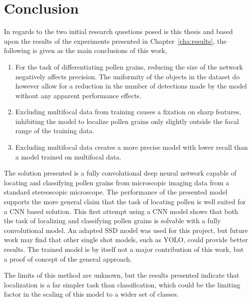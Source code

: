 \chapter{Conclusion}\label{cha:conclusion}


In regards to the two initial research questions posed is this thesis and based upon the results of the experiments presented in Chapter~\ref{cha:results}, the following is given as the main conclusions of this work,

\begin{enumerate}
    \item For the task of differentiating pollen grains, reducing the size of the network negatively affects precision. The uniformity of the objects in the dataset do however allow for a reduction in the number of detections made by the model without any apparent performance effects.
    \item Excluding multifocal data from training causes a fixation on sharp features, inhibiting the model to localize pollen grains only slightly outside the focal range of the training data.
    \item Excluding multifocal data creates a more precise model with lower recall than a model trained on multifocal data.
\end{enumerate}

The solution presented is a fully convolutional deep neural network capable of locating and classifying pollen grains from microscopic imaging data from a standard stereoscopic microscope.
The performance of the presented model supports the more general claim that the task of locating pollen is well suited for a CNN based solution.
This first attempt using a CNN model shows that both the task of localizing and classifying pollen grains is solvable with a fully convolutional model.
An adapted SSD model was used for this project, but future work may find that other single shot models, such as YOLO, could provide better results.
The trained model is by itself not a major contribution of this work, but a proof of concept of the general approach.

The limits of this method are unknown, but the results presented indicate that localization is a far simpler task than classification, which could be the limiting factor in the scaling of this model to a wider set of classes.



